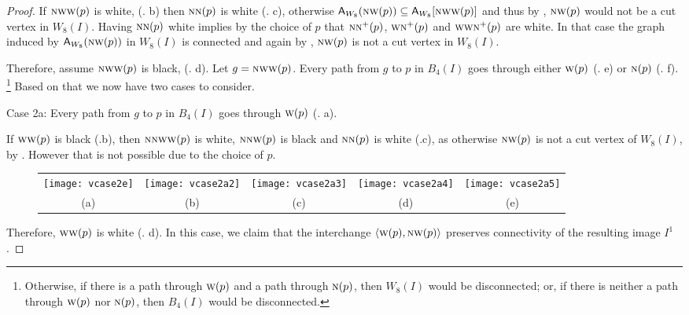 \documentclass[lotsofwhite,charterfonts]{patmorin}
\newcommand{\N}{\textsc{n}}
\newcommand{\W}{\textsc{w}}
\newcommand{\NW}{\textsc{nw}}
\newcommand{\ic}[2]{\langle #1,#2 \rangle}
\newcommand{\A}[2]{\ensuremath{\protect\textup{\textsf{A}}_{#2}(#1)}}
\newcommand{\AC}[2]{\ensuremath{\protect\textup{\textsf{A}}_{#2}[#1]}}
\newcommand{\se}{\ensuremath{\subseteq}}
\begin{document}
\begin{proof}
If $\NW\W(p)$ is white, (. b) then $\N\N(p)$ is white (. c), otherwise $\A{\NW(p)}{W_8}\se \AC{\NW\W(p)}{W_8}$ and thus by , $\NW(p)$ would not be a cut vertex in $W_8(I)$. Having $\N\N(p)$ white implies by the choice of $p$ that $\N\N^+(p)$, $\W\N^+(p)$ and $\W\W\N^+(p)$ are white. In that case the graph induced by \A{\NW(p)}{W_8} in $W_8(I)$ is connected and again by , $\NW(p)$ is not a cut vertex in $W_8(I)$.


Therefore, assume $\NW\W(p)$ is black, (. d). Let $g=\NW\W(p)$. Every path from $g$ to $p$ in $B_4(I)$ goes through  either $\W(p)$  (. e) or $\N(p)$  (. f). \footnote{Otherwise, if there is a path through $\W(p)$ and a path through $\N(p)$, then $W_8(I)$ would be disconnected; or, if there is neither a path through $\W(p)$ nor $\N(p)$, then $B_4(I)$ would be disconnected.} Based on that we now have two cases to consider.

\noindent Case 2a: Every path from $g$ to $p$ in $B_4(I)$ goes through $\W(p)$ (. a). 

If $\W\W(p)$ is black (.b), then $\N\N\W\W(p)$ is white, $\N\N\W(p)$ is black and  $\N\N(p)$ is white (.c), as otherwise $\NW(p)$ is not a cut vertex of $W_8(I)$, by . However that is not possible due to the choice of $p$.

\begin{figure}[htbp]
\begin{center}
\begin{tabular}{ccccc}
\texttt{[image: vcase2e]} & 
\texttt{[image: vcase2a2]} & 
\texttt{[image: vcase2a3]} & 
\texttt{[image: vcase2a4]} &
\texttt{[image: vcase2a5]}
\\
(a) & (b) & (c) & (d) & (e)
\end{tabular}
\end{center}
\caption{}
\end{figure}

Therefore,  $\W\W(p)$ is white (. d). In this case, we claim that the interchange $\ic{\W(p)}{\NW(p)}$ preserves connectivity of the resulting image $I^1$. 



\end{proof}
\end{document}

